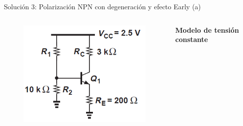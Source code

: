 \documentclass[t,aspectratio=169]{beamer}
\begin{document}
\begin{frame}{Solución 3: Polarización NPN con degeneración y efecto Early (a)}

\begin{columns}
\begin{column}{0.35\textwidth}

\begin{figure}[H]
    \flushleft
    \includegraphics[width=\textwidth]{figuras/efecto_early_ejemplo_3.png}
\end{figure}

\end{column}
\begin{column}{0.65\textwidth}

\textbf{Modelo de tensión constante}

\end{column}
\end{columns}
    
\end{frame}
\end{document}
